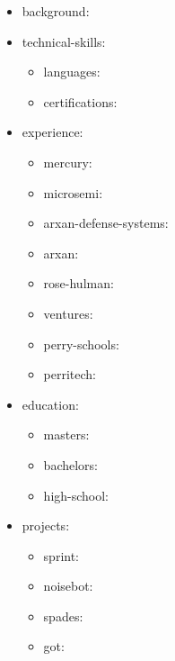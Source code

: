 \iffalse
{}
\begin{cvparagraph}
\begin{itemize}[leftmargin=2ex, nosep, noitemsep]
\item background: 
\item technical-skills: 
	\begin{itemize}[leftmargin=2ex, nosep, noitemsep]
	\item languages: 
	\item certifications: 
	\end{itemize}
\item experience: 
	\begin{itemize}[leftmargin=2ex, nosep, noitemsep]
	\item mercury: 
	\item microsemi: 
	\item arxan-defense-systems: 
	\item arxan: 
	\item rose-hulman: 
	\item ventures: 
	\item perry-schools: 
	\item perritech: 
	\end{itemize}
\item education: 
	\begin{itemize}[leftmargin=2ex, nosep, noitemsep]
	\item masters: 
	\item bachelors: 
	\item high-school: 
	\end{itemize}
\item projects: 
	\begin{itemize}[leftmargin=2ex, nosep, noitemsep]
	\item sprint: 
	\item noisebot: 
	\item spades: 
	\item got: 

\end{itemize}
\end{itemize}
\end{cvparagraph}
